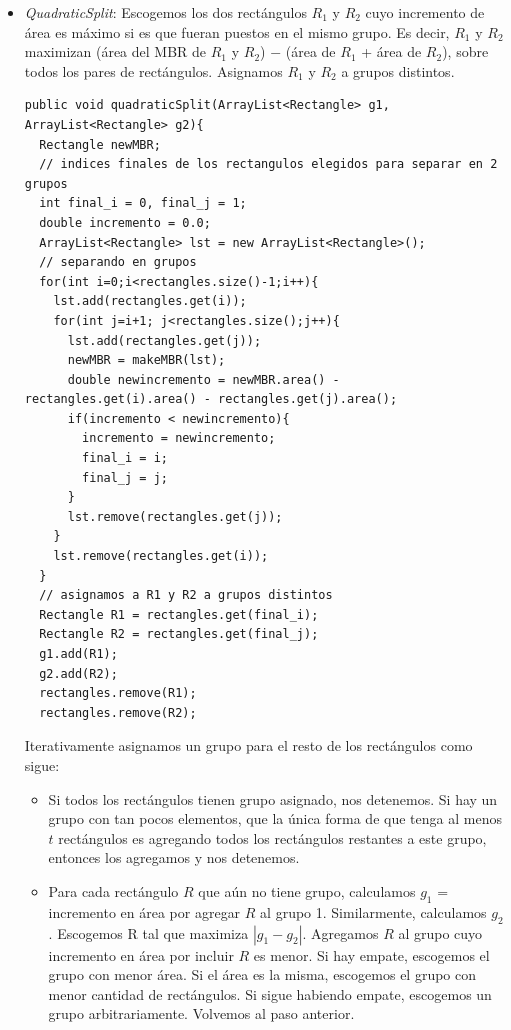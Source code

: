 \documentclass[letterpaper,12pt]{article}
\begin{document}
\begin{itemize}
\item \textit{QuadraticSplit}: Escogemos los dos rect\'angulos $R_1$ y $R_2$ cuyo incremento de \'area es m\'aximo si es que fueran puestos en el mismo grupo. Es decir, $R_1$ y $R_2$ maximizan (\'area del MBR de $R_1$ y $R_2$) $-$ (\'area de $R_1$ + \'area de $R_2$), sobre todos los pares de rect\'angulos. Asignamos $R_1$ y $R_2$ a grupos distintos.

\lstset{language=Java, breaklines=true, basicstyle=\footnotesize}
\begin{lstlisting}[frame=single]
public void quadraticSplit(ArrayList<Rectangle> g1, ArrayList<Rectangle> g2){
  Rectangle newMBR;
  // indices finales de los rectangulos elegidos para separar en 2 grupos
  int final_i = 0, final_j = 1;
  double incremento = 0.0;
  ArrayList<Rectangle> lst = new ArrayList<Rectangle>();
  // separando en grupos
  for(int i=0;i<rectangles.size()-1;i++){
    lst.add(rectangles.get(i));
    for(int j=i+1; j<rectangles.size();j++){
      lst.add(rectangles.get(j));
      newMBR = makeMBR(lst);
      double newincremento = newMBR.area() - rectangles.get(i).area() - rectangles.get(j).area();
      if(incremento < newincremento){
        incremento = newincremento;
        final_i = i;
        final_j = j;
      }
      lst.remove(rectangles.get(j));
    }
    lst.remove(rectangles.get(i));
  }
  // asignamos a R1 y R2 a grupos distintos
  Rectangle R1 = rectangles.get(final_i);
  Rectangle R2 = rectangles.get(final_j);
  g1.add(R1);
  g2.add(R2);
  rectangles.remove(R1);
  rectangles.remove(R2);

\end{lstlisting}
Iterativamente asignamos un grupo para el resto de los rect\'angulos como sigue:
\begin{itemize}
\item Si todos los rect\'angulos tienen grupo asignado, nos detenemos. Si hay un grupo con tan pocos elementos, que la \'unica forma de que tenga al menos $t$ rect\'angulos es agregando todos los rect\'angulos restantes a este grupo, entonces los agregamos y nos detenemos.
\item Para cada rect\'angulo $R$ que a\'un no tiene grupo, calculamos $g_1$ = incremento en \'area por agregar $R$ al grupo 1. Similarmente, calculamos $g_2$. Escogemos R tal que maximiza $|g_1 - g_2|$. Agregamos $R$ al grupo cuyo incremento en \'area por incluir $R$ es menor. Si hay empate, escogemos el grupo con menor \'area. Si el \'area es la misma, escogemos el grupo con menor cantidad de rect\'angulos. Si sigue habiendo empate, escogemos un grupo arbitrariamente. Volvemos al paso anterior.


\end{itemize}
\end{itemize}
\end{document}
